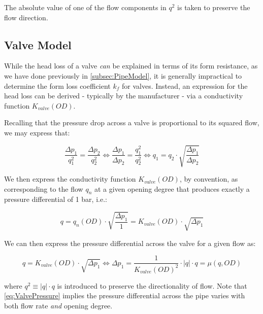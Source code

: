 The absolute value of one of the flow components in $q^{2}$ is taken to preserve the flow direction.


\subsection{Valve Model}\label{subsec:ValveModel}

While the head loss of a valve \textit{can} be explained in terms of its form resistance, as we have done previously in \cref{subsec:PipeModel}, it is generally impractical to determine the form loss coefficient $k_f$ for valves. Instead, an expression for the head loss can be derived - typically by the manufacturer - via a conductivity function $K_{valve}(OD)$.

\smallskip

Recalling that the pressure drop across a valve is proportional to its squared flow, we may express that:

\begin{equation}\label{eq:HydrodynamicRatio}
	\frac{\Delta p_1}{q_1^2} = \frac{\Delta p_2}{q_2^2} \Leftrightarrow 
	\frac{\Delta p_1}{\Delta p_2} = \frac{q_1^2}{q_2^2}
	\Leftrightarrow
	q_1 = q_2\cdot\sqrt{\frac{\Delta p_1}{\Delta p_2}}
\end{equation}

We then express the conductivity function $K_{valve}(OD)$, by convention, as corresponding to the flow $q_n$ at a given opening degree that produces exactly a pressure differential of 1 bar, i.e.:

\begin{equation}\label{eq:Kvalve}
	q = q_n(OD)\cdot\sqrt{\frac{\Delta p_1}{1}} = K_{valve}(OD)\cdot\sqrt{\Delta p_1}
\end{equation}

We can then express the pressure differential across the valve for a given flow as:

\begin{equation}\label{eq:ValvePressure}
	 q = K_{valve}(OD)\cdot\sqrt{\Delta p_1}
	 \Leftrightarrow
	 \Delta p_1 = \frac{1}{K_{valve}(OD)^2} \cdot |q|\cdot q = \mu(q,OD)
\end{equation}

where $q^2 \equiv |q|\cdot q$ is introduced to preserve the directionality of flow. Note that \cref{eq:ValvePressure} implies the pressure differential across the pipe varies with both flow rate \textit{and} opening degree.

\smallskip

